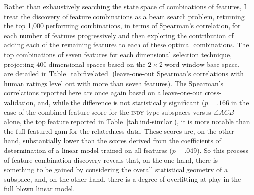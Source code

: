 Rather than exhaustively searching the state space of combinations of features, I treat the discovery of feature combinations as a beam search problem, returning the top 1,000 performing combinations, in terms of Spearman's correlation, for each number of features progressively and then exploring the contribution of adding each of the remaining features to each of these optimal combinations.  The top combinations of seven features for each dimensional selection technique, projecting 400 dimensional spaces based on the $2 \times 2$ word window base space, are detailed in Table~\ref{tab:fivelated} (leave-one-out Spearman's correlations with human ratings level out with more than seven features).  The Spearman's correlations reported here are once again based on a leave-one-out cross-validation, and, while the difference is not statistically significant ($p =.166$ in the case of the combined feature score for the \textsc{indy} type subspaces versus $\angle ACB$ alone, the top feature reported in Table~\ref{tab:ind-similar}), it is more notable than the full featured gain for the relatedness data.  These scores are, on the other hand, substantially lower than the scores derived from the coefficients of determination of a linear model trained on all features ($p = .049$).  So this process of feature combination discovery reveals that, on the one hand, there is something to be gained by considering the overall statistical geometry of a subspace, and, on the other hand, there is a degree of overfitting at play in the full blown linear model.

